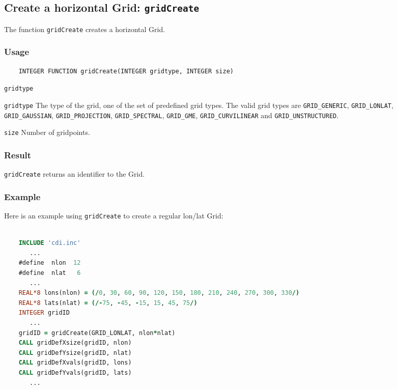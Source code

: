 

\subsection{Create a horizontal Grid: \texttt{gridCreate}}
\label{gridCreate}

The function {\texttt{gridCreate}} creates a horizontal Grid.

\subsubsection*{Usage}

\begin{verbatim}
    INTEGER FUNCTION gridCreate(INTEGER gridtype, INTEGER size)
\end{verbatim}

\hspace*{4mm}\begin{minipage}[]{15cm}
\begin{deflist}{\texttt{gridtype}\ }
\item[\texttt{gridtype}]
The type of the grid, one of the set of predefined {\CDI} grid types.
                     The valid {\CDI} grid types are {\texttt{GRID\_GENERIC}}, {\texttt{GRID\_LONLAT}},
                     {\texttt{GRID\_GAUSSIAN}}, {\texttt{GRID\_PROJECTION}}, {\texttt{GRID\_SPECTRAL}},
                     {\texttt{GRID\_GME}}, {\texttt{GRID\_CURVILINEAR}} and {\texttt{GRID\_UNSTRUCTURED}}.
\item[\texttt{size}]
Number of gridpoints.

\end{deflist}
\end{minipage}

\subsubsection*{Result}

{\texttt{gridCreate}} returns an identifier to the Grid.


\subsubsection*{Example}

Here is an example using {\texttt{gridCreate}} to create a regular lon/lat Grid:

\begin{lstlisting}[language=Fortran, backgroundcolor=\color{pyellow}, basicstyle=\small, columns=flexible]

    INCLUDE 'cdi.inc'
       ...
    #define  nlon  12
    #define  nlat   6
       ...
    REAL*8 lons(nlon) = (/0, 30, 60, 90, 120, 150, 180, 210, 240, 270, 300, 330/)
    REAL*8 lats(nlat) = (/-75, -45, -15, 15, 45, 75/)
    INTEGER gridID
       ...
    gridID = gridCreate(GRID_LONLAT, nlon*nlat)
    CALL gridDefXsize(gridID, nlon)
    CALL gridDefYsize(gridID, nlat)
    CALL gridDefXvals(gridID, lons)
    CALL gridDefYvals(gridID, lats)
       ...
\end{lstlisting}


